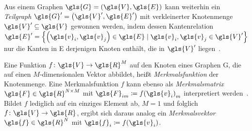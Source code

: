 Aus einem Graphen $\gls{G} = \left(\gls{V}, \gls{E}\right)$ kann weiterhin ein \emph{Teilgraph} $\gls{G}^{\prime} = \left(\gls{V}^{\prime}, \gls{E}^{\prime}\right)$ mit verkleinerter Knotenmenge $\gls{V}^{\prime} \subseteq \gls{V}$ gewonnen werden, indem dessen Kantenrelation $\gls{E}^{\prime} = \left\{\left(\gls{v}_i, \gls{v}_j\right) \in \gls{E} \mid \gls{v}_i, \gls{v}_j \in \gls{V}^{\prime} \right\}$ nur die Kanten in \gls{E} derjenigen Knoten enthält, die in $\gls{V}^{\prime}$ liegen~\cite{patchy}.

Eine Funktion $f \colon \gls{V} \to \gls{R}^M$ auf den Knoten eines Graphen \gls{G}, die auf einen $M$-dimensionalen Vektor abbildet, heißt \emph{Merkmalsfunktion} der Knotenmenge.
Eine Merkmalsfunktion $f$ kann ebenso als \emph{Merkmalsmatrix} $\gls{F} \in \gls{R}^{N \times M}$ mit $ \gls{F}_{im} \coloneqq {f\left(\gls{v}_i\right)}_m$ interpretiert werden~\cite{Shuman}.
Bildet $f$ lediglich auf ein einziges Element ab, \dhe{} $M=1$ und folglich $f \colon \gls{V} \to \gls{R}$, ergibt sich daraus analog ein \emph{Merkmalsvektor} $\gls{f} \in \gls{R}^N$ mit $\gls{f}_i \coloneqq f\left(\gls{v}_i\right)$.
